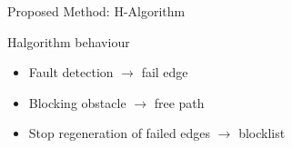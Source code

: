 

\begin{frame}[fragile]{Proposed Method: H-Algorithm} 
\begin{block}{Halgorithm behaviour}
    \begin{itemize}
      \item Fault detection $\rightarrow$ fail edge
      \item Blocking obstacle $\rightarrow$ free path 
      \item Stop regeneration of failed edges $\rightarrow$ blocklist
    \end{itemize}
  \end{block}
\end{frame}
